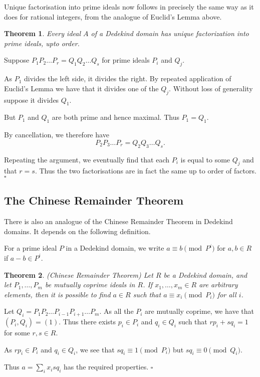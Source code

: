 \documentclass[10pt]{article}
\newcommand{\qed}{\square}
\newtheorem{theorem}{Theorem}[section]
\newenvironment{proof}[1][Proof]{\begin{trivlist}
\item[\hskip \labelsep {\bfseries #1}]}{\end{trivlist}}
\newenvironment{definition}[1][Definition]{\begin{trivlist}
\item[\hskip \labelsep {\bfseries #1}]}{\end{trivlist}}
\begin{document}
Unique factorisation into prime ideals now follows in precisely the same way as it does for rational integers, from the analogue of Euclid's Lemma above.

\begin{theorem}
Every ideal $A$ of a Dedekind domain has unique factorization into prime ideals, upto order.
\end{theorem}

\begin{proof}
Suppose $P_1P_2\ldots P_r = Q_1Q_2\ldots Q_s$ for prime ideals $P_i$ and $Q_j$.

As $P_1$ divides the left side, it divides the right. By repeated application of Euclid's Lemma we have that it divides one of the $Q_j$. Without loss of generality suppose it divides $Q_1$.

But $P_1$ and $Q_1$ are both prime and hence maximal. Thus $P_1 = Q_1$.

By cancellation, we therefore have
$$P_2P_3\ldots P_r = Q_2Q_3\ldots Q_s.$$

Repeating the argument, we eventually find that each $P_i$ is equal to some $Q_j$ and that $r = s$. Thus the two factorisations are in fact the same up to order of factors. $\qed$
\end{proof} 

\subsection{The Chinese Remainder Theorem}

There is also an analogue of the Chinese Remainder Theorem in Dedekind domains. It depends on the following definition.

\begin{definition}
For a prime ideal $P$ in a Dedekind domain, we write $a \equiv b \pmod{P^i}$ for $a, b \in R$ if $a - b \in P^i$.
\end{definition}

\begin{theorem} (Chinese Remainder Theorem)
Let $R$ be a Dedekind domain, and let $P_1, \ldots, P_m$ be mutually coprime ideals in $R$. If $x_1, \ldots, x_m \in R$ are arbitrary elements, then it is possible to find $a \in R$ such that $a \equiv x_i \pmod{P_i}$ for all $i$.
\end{theorem}

\begin{proof}
Let $Q_i = P_1P_2\ldots P_{i-1}P_{i+1}\ldots P_m$. As all the $P_i$ are mutually coprime, we have that $(P_i, Q_i) = (1)$. Thus there exists $p_i \in P_i$ and $q_i \in Q_i$ such that $rp_i + sq_i = 1$ for some $r, s \in R$.

As $rp_i \in P_i$ and $q_i \in Q_i$, we see that $sq_i \equiv 1 \pmod{P_i}$ but $sq_i \equiv 0 \pmod{Q_i}$.

Thus $a = \sum_i x_isq_i$ has the required properties. $\qed$
\end{proof}
\end{document}
